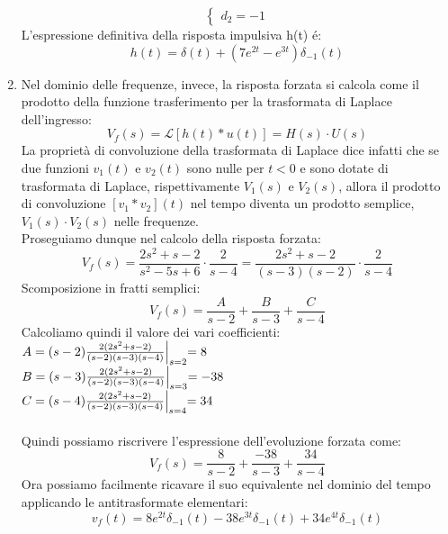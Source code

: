 \documentclass[12pt,a4paper]{article}
\begin{document}
\begin{enumerate}
\[\begin{cases}
				d_2 = -1
			\end{cases}
		\]
		L'espressione definitiva della risposta impulsiva h(t) \'e:
		\[
			h(t) = \delta(t) + (7e^{2t} - e^{3t})\delta_{-1}(t)
		\]
		\item Nel dominio delle frequenze, invece, la risposta forzata si calcola come il prodotto della funzione trasferimento per la trasformata di Laplace dell'ingresso:
		\[
			V_f(s) = \mathcal{L}[h(t)*u(t)] = H(s)\cdot U(s)
		\]
		La proprietà di convoluzione della trasformata di Laplace dice infatti che se due funzioni $v_1(t)$ e $v_2(t)$ sono nulle per $t<0$ e sono dotate di trasformata di Laplace, rispettivamente $V_1(s)$ e $V_2(s)$, allora il prodotto di convoluzione $[v_1 * v_2](t)$ nel tempo diventa un prodotto semplice, $V_1(s)\cdot V_2(s)$ nelle frequenze.\\ Proseguiamo dunque nel calcolo della risposta forzata:
		\[
			V_f(s) = \frac{2s^2 + s - 2}{s^2 - 5s + 6}\cdot\frac{2}{s-4} = \frac{2s^2 + s - 2}{(s-3)(s-2)} \cdot \frac{2}{s-4}
		\]
		Scomposizione in fratti semplici:
		\[
			V_f(s) = \frac{A}{s-2}+\frac{B}{s-3}+\frac{C}{s-4}
		\]
		Calcoliamo quindi il valore dei vari coefficienti:\vspace{5px}\\
		$A = (s-2)\frac{2(2s^2+s-2)}{(s-2)(s-3)(s-4)}\Bigl\lvert_{s = 2} = 8$\vspace{5px}\\
		$B = (s-3)\frac{2(2s^2+s-2)}{(s-2)(s-3)(s-4)}\Bigl\lvert_{s = 3} = -38$\vspace{5px}\\
		$C = (s-4)\frac{2(2s^2+s-2)}{(s-2)(s-3)(s-4)}\Bigl\lvert_{s = 4} = 34$\vspace{5px}\\\\
		Quindi possiamo riscrivere l'espressione dell'evoluzione forzata come:
		\[
			V_f(s) = \frac{8}{s-2}+\frac{-38}{s-3}+\frac{34}{s-4}
		\]
		Ora possiamo facilmente ricavare il suo equivalente nel dominio del tempo applicando le antitrasformate elementari:
		\[
			v_f(t) = 8e^{2t}\delta_{-1}(t) -38e^{3t}\delta_{-1}(t) + 34e^{4t}\delta_{-1}(t)
		\]
	\end{enumerate}
	\newpage
\end{document}
